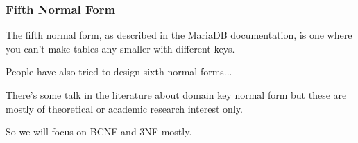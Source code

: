 \begin{frame}
\frametitle{Fifth Normal Form}

The fifth normal form, as described in the MariaDB documentation, is one where you can't make tables any smaller with different keys. 

People have also tried to design sixth normal forms... 

There's some talk in the literature about domain key normal form but these are mostly of theoretical or academic research interest only.

So we will focus on BCNF and 3NF mostly.

\end{frame}







